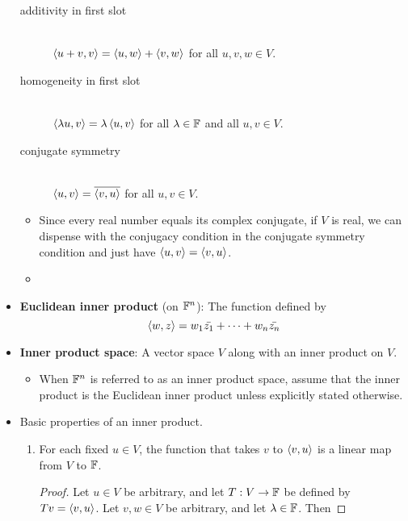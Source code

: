 \documentclass[../main.tex]{subfiles}
\begin{document}
\begin{itemize}
\begin{description}
        \item[additivity in first slot] \hfill\\ $\left\langle{u+v},{v}\right\rangle=\left\langle{u},{w}\right\rangle+\left\langle{v},{w}\right\rangle$ for all $u,v,w\in V$.
        \item[homogeneity in first slot] \hfill\\ $\left\langle{\lambda u},{v}\right\rangle=\lambda\left\langle{u},{v}\right\rangle$ for all $\lambda\in\mathbb{F}$ and all $u,v\in V$.
        \item[conjugate symmetry] \hfill\\ $\left\langle{u},{v}\right\rangle=\overline{\left\langle{v},{u}\right\rangle}$ for all $u,v\in V$.
    \end{description}
    \begin{itemize}
        \item Since every real number equals its complex conjugate, if $V$ is real, we can dispense with the conjugacy condition in the conjugate symmetry condition and just have $\left\langle{u},{v}\right\rangle=\left\langle{v},{u}\right\rangle$.
        \item {}
    \end{itemize}
    \item \textbf{Euclidean inner product} (on $\mathbb{F}^n$): The function defined by
    \begin{equation*}
        \left\langle{w},{z}\right\rangle = w_1\bar{z_1}+\cdots+w_n\bar{z_n}
    \end{equation*}
    \item \textbf{Inner product space}: A vector space $V$ along with an inner product on $V$.
    \begin{itemize}
        \item When $\mathbb{F}^n$ is referred to as an inner product space, assume that the inner product is the Euclidean inner product unless explicitly stated otherwise.
    \end{itemize}
    \item Basic properties of an inner product.
    \begin{theorem}\label{trm:inpProperties}\leavevmode
        \begin{enumerate}[label={\textup{(}\alph*\textup{)}},ref={\thetheorem\arabic*}]
            \item \label{trm:inpPropertiesa}For each fixed $u\in V$, the function that takes $v$ to $\left\langle{v},{u}\right\rangle$ is a linear map from $V$ to $\mathbb{F}$.
            \begin{proof}
                Let $u\in V$ be arbitrary, and let $T:V\to\mathbb{F}$ be defined by $Tv=\left\langle{v},{u}\right\rangle$. Let $v,w\in V$ be arbitrary, and let $\lambda\in\mathbb{F}$. Then

\end{proof}
\end{enumerate}
\end{theorem}
\end{itemize}
\end{document}
